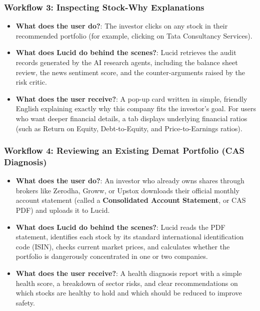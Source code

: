 \subsubsection{Workflow 3: Inspecting Stock-Why Explanations}
\begin{itemize}
    \item \textbf{What does the user do?}: The investor clicks on any stock in their recommended portfolio (for example, clicking on Tata Consultancy Services).
    \item \textbf{What does Lucid do behind the scenes?}: Lucid retrieves the audit records generated by the AI research agents, including the balance sheet review, the news sentiment score, and the counter-arguments raised by the risk critic.
    \item \textbf{What does the user receive?}: A pop-up card written in simple, friendly English explaining exactly why this company fits the investor's goal. For users who want deeper financial details, a tab displays underlying financial ratios (such as Return on Equity, Debt-to-Equity, and Price-to-Earnings ratios).
\end{itemize}

\subsubsection{Workflow 4: Reviewing an Existing Demat Portfolio (CAS Diagnosis)}
\begin{itemize}
    \item \textbf{What does the user do?}: An investor who already owns shares through brokers like Zerodha, Groww, or Upstox downloads their official monthly account statement (called a \textbf{Consolidated Account Statement}, or CAS PDF) and uploads it to Lucid.
    \item \textbf{What does Lucid do behind the scenes?}: Lucid reads the PDF statement, identifies each stock by its standard international identification code (ISIN), checks current market prices, and calculates whether the portfolio is dangerously concentrated in one or two companies.
    \item \textbf{What does the user receive?}: A health diagnosis report with a simple health score, a breakdown of sector risks, and clear recommendations on which stocks are healthy to hold and which should be reduced to improve safety.
\end{itemize}

